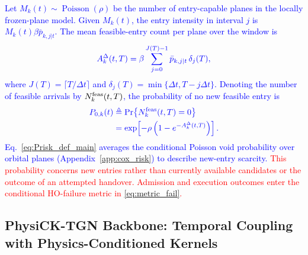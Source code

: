 \documentclass[10pt,letterpaper,journal]{IEEEtran}
\newcommand{\revnew}[1]{\textcolor{red}{#1}}
\begin{document}
\textcolor{blue}{Let $M_k(t)\sim\operatorname{Poisson}(\rho)$ be the number of entry-capable planes in the locally frozen-plane model.
Given $M_k(t)$, the entry intensity in interval $j$ is $M_k(t)\beta\bar p_{k,j|t}$.
The mean feasible-entry count per plane over the window is}
\begin{equation}
\textcolor{blue}{
A_k^\Delta(t,T)
=\beta\sum_{j=0}^{J(T)-1}\bar p_{k,j|t}\,\delta_j(T),}    
\end{equation}
\textcolor{blue}{where $J(T)=\lceil T/\Delta t\rceil$ and $\delta_j(T)=\min\{\Delta t,T-j\Delta t\}$.
Denoting the number of feasible arrivals by $N_k^{\rm feas}(t,T)$, the probability of no new feasible entry is}
\begin{equation}
\textcolor{blue}{
\begin{aligned}
P_{0,k}(t)
&\triangleq\Pr\!\left\{N_k^{\rm feas}(t,T)=0\right\}\\
&=\exp\!\left[-\rho\left(1-e^{-A_k^\Delta(t,T)}\right)\right].
\end{aligned}}
\label{eq:Prisk_def_main}
\end{equation}
\textcolor{blue}{Eq.~\eqref{eq:Prisk_def_main} averages the conditional Poisson void probability over orbital planes (Appendix~\ref{app:cox_risk}) to describe new-entry scarcity.}
\revnew{This probability concerns new entries rather than currently available candidates or the outcome of an attempted handover. Admission and execution outcomes enter the conditional HO-failure metric in \eqref{eq:metric_fail}.}



\vspace{-4mm}
\subsection{PhysiCK-TGN Backbone: Temporal Coupling with Physics-Conditioned Kernels}
\label{subsec:physick_main}
\end{document}
